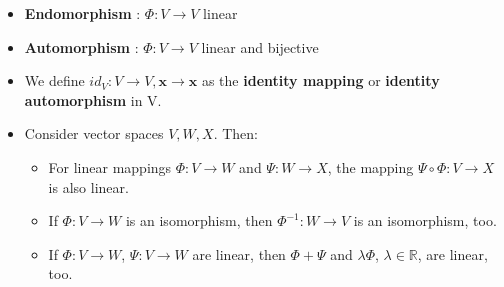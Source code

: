 \begin{itemize}
    \item \textbf{Endomorphism} \label{Endomorphism}: $\Phi : V \rightarrow V$ linear

    \item \textbf{Automorphism} \label{Automorphism}: $\Phi : V \rightarrow V$ linear and bijective

    \item We define $id_V : V \rightarrow V , \mathbf{x} \rightarrow \mathbf{x}$ as the \textbf{identity mapping} or \textbf{identity automorphism} \label{identity mapping or identity automorphism} in V.

    \item Consider vector spaces $V, W, X$. Then:
    \begin{itemize}
        \item For linear mappings $\Phi : V \rightarrow W$ and $\Psi : W \rightarrow X$, the mapping $\Psi \circ \Phi : V \rightarrow X$ is also linear.

        \item If $\Phi : V \rightarrow W$ is an isomorphism, then $\Phi^{-1} : W \rightarrow V$ is an isomorphism, too.

        \item If $\Phi : V \rightarrow W$, $\Psi : V \rightarrow W$ are linear, then $\Phi + \Psi$ and $\lambda\Phi$, $\lambda \in \mathbb{R}$, are linear, too.
    \end{itemize}
    
\end{itemize}











